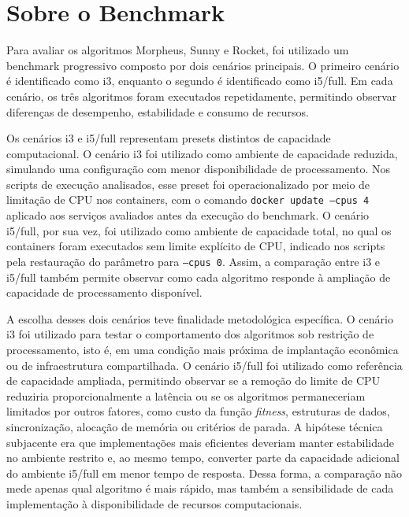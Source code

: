 \section{Sobre o Benchmark}
\label{sec:sobre-o-benchmark}

Para avaliar os algoritmos Morpheus, Sunny e Rocket, foi utilizado um benchmark progressivo composto por dois cenários principais. O primeiro cenário é identificado como i3, enquanto o segundo é identificado como i5/full. Em cada cenário, os três algoritmos foram executados repetidamente, permitindo observar diferenças de desempenho, estabilidade e consumo de recursos.

Os cenários i3 e i5/full representam presets distintos de capacidade computacional. O cenário i3 foi utilizado como ambiente de capacidade reduzida, simulando uma configuração com menor disponibilidade de processamento. Nos scripts de execução analisados, esse preset foi operacionalizado por meio de limitação de CPU nos containers, com o comando \texttt{docker update --cpus 4} aplicado aos serviços avaliados antes da execução do benchmark. O cenário i5/full, por sua vez, foi utilizado como ambiente de capacidade total, no qual os containers foram executados sem limite explícito de CPU, indicado nos scripts pela restauração do parâmetro para \texttt{--cpus 0}. Assim, a comparação entre i3 e i5/full também permite observar como cada algoritmo responde à ampliação de capacidade de processamento disponível.

A escolha desses dois cenários teve finalidade metodológica específica. O cenário i3 foi utilizado para testar o comportamento dos algoritmos sob restrição de processamento, isto é, em uma condição mais próxima de implantação econômica ou de infraestrutura compartilhada. O cenário i5/full foi utilizado como referência de capacidade ampliada, permitindo observar se a remoção do limite de CPU reduziria proporcionalmente a latência ou se os algoritmos permaneceriam limitados por outros fatores, como custo da função \textit{fitness}, estruturas de dados, sincronização, alocação de memória ou critérios de parada. A hipótese técnica subjacente era que implementações mais eficientes deveriam manter estabilidade no ambiente restrito e, ao mesmo tempo, converter parte da capacidade adicional do ambiente i5/full em menor tempo de resposta. Dessa forma, a comparação não mede apenas qual algoritmo é mais rápido, mas também a sensibilidade de cada implementação à disponibilidade de recursos computacionais.


